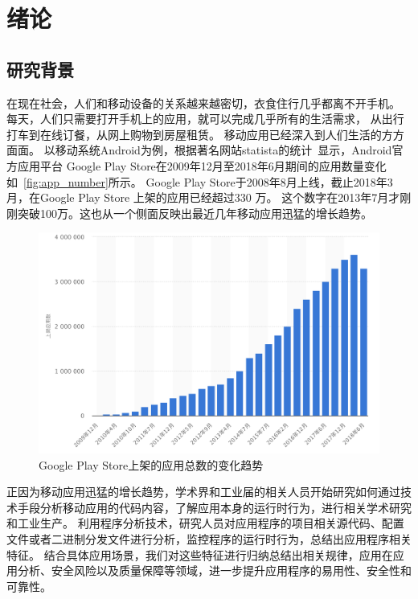\chapter {绪论}
\label{chp:intro}

\section{研究背景}

在现在社会，人们和移动设备的关系越来越密切，衣食住行几乎都离不开手机。
每天，人们只需要打开手机上的应用，就可以完成几乎所有的生活需求，
从出行打车到在线订餐，从网上购物到房屋租赁。
移动应用已经深入到人们生活的方方面面。
以移动系统Android为例，根据著名网站statista的统计~\cite{GoogleP55:online}显示，Android官方应用平台 Google Play Store在2009年12月至2018年6月期间的应用数量变化如~\autoref{fig:app_number}所示。
Google Play Store于2008年8月上线，截止2018年3月，在Google Play Store 上架的应用已经超过330 万。
这个数字在2013年7月才刚刚突破100万。这也从一个侧面反映出最近几年移动应用迅猛的增长趋势。

\begin{figure}[h]
	\centering
	\includegraphics[width=\textwidth]{./Figures/app-numbers.png}
	\caption{Google Play Store上架的应用总数的变化趋势}
	\label{fig:app_number}
\end{figure}


正因为移动应用迅猛的增长趋势，学术界和工业届的相关人员开始研究如何通过技术手段分析移动应用的代码内容，了解应用本身的运行时行为，进行相关学术研究和工业生产。
利用程序分析技术，研究人员对应用程序的项目相关源代码、配置文件或者二进制分发文件进行分析，监控程序的运行时行为，总结出应用程序相关特征。
结合具体应用场景，我们对这些特征进行归纳总结出相关规律，应用在应用分析、安全风险以及质量保障等领域，进一步提升应用程序的易用性、安全性和可靠性。

